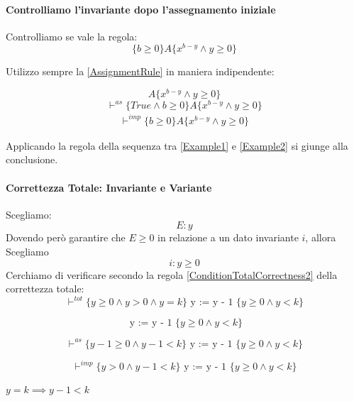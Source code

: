\begin{esempio}
				      \paragraph{Controlliamo l'invariante dopo l'assegnamento iniziale}
                        Controlliamo se vale la regola:
                         \[\{b \geq 0\}A\{x^{b-y} \land y \geq 0\}\]
                         
                         Utilizzo sempre la \ref{AssignmentRule} in maniera indipendente:
                        
                        \[A\{x^{b-y} \land y \geq 0\}\]
 				        \[\vdash^{as}\{ True \land b \geq 0 \} A \{ x^{b-y} \land y \geq 0\}\]
 				        \begin{align}
      				        \vdash^{imp}\{b \geq 0 \}A\{x^{b-y} \land y \geq 0\}
      				        \label{Example2}
 				        \end{align}
				      \begin{nota}
				      Applicando la regola della sequenza tra \ref{Example1} e \ref{Example2} si giunge alla conclusione.
				      \end{nota} 
                    \paragraph{Correttezza Totale: Invariante e Variante}
                    Scegliamo:
                    \[E: y\]
			      Dovendo però garantire che $E\geq 0$ in relazione a un dato invariante $i$, allora Scegliamo
			      \[i: y \geq 0\] 
			      Cerchiamo di verificare secondo la regola \ref{ConditionTotalCorrectness2} della correttezza totale:
			      \[\vdash^{tot}\{y \geq 0 \land y > 0 \land y=k\}\mbox{ y := y - 1 }\{y \geq 0\land y<k\}\]
			      
			      \[\mbox{ y := y - 1 }\{y \geq 0\land y < k\}\]

			      \[\vdash^{as}\{y - 1 \geq 0\land y-1 < k\}\mbox{ y := y - 1 }\{y \geq 0\land y<k\}\]
			      
			      \[\vdash^{imp}\{y > 0 \land y-1 < k\}\mbox{ y := y - 1 }\{y \geq 0\land y<k\}\]
			      
			      \begin{nota}
			      $y = k \implies y - 1 < k$
			      \end{nota}
			      
				    \end{esempio}   
				     
				     
